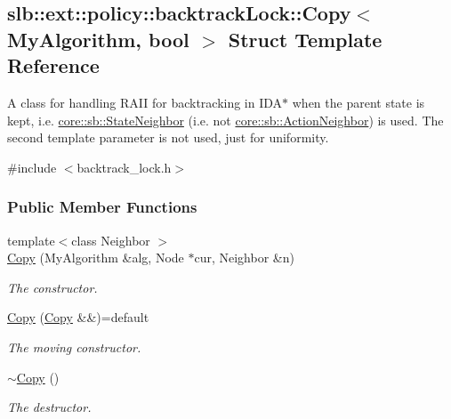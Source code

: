 \hypertarget{structslb_1_1ext_1_1policy_1_1backtrackLock_1_1Copy}{}\subsection{slb\+:\+:ext\+:\+:policy\+:\+:backtrack\+Lock\+:\+:Copy$<$ My\+Algorithm, bool $>$ Struct Template Reference}
\label{structslb_1_1ext_1_1policy_1_1backtrackLock_1_1Copy}


A class for handling R\+A\+II for backtracking in I\+D\+A$\ast$ when the parent state is kept, i.\+e. \hyperlink{structslb_1_1core_1_1sb_1_1StateNeighbor}{core\+::sb\+::\+State\+Neighbor} (i.\+e. not \hyperlink{structslb_1_1core_1_1sb_1_1ActionNeighbor}{core\+::sb\+::\+Action\+Neighbor}) is used. The second template parameter is not used, just for uniformity.  




{\ttfamily \#include $<$backtrack\+\_\+lock.\+h$>$}

\subsubsection*{Public Member Functions}
\begin{DoxyCompactItemize}
\item 
{\footnotesize template$<$class Neighbor $>$ }\\\hyperlink{structslb_1_1ext_1_1policy_1_1backtrackLock_1_1Copy_a419323ae82797feaaca6f7d5a488f7ce}{Copy} (My\+Algorithm \&alg, Node $\ast$cur, Neighbor \&n)
\begin{DoxyCompactList}\small\item\em The constructor. \end{DoxyCompactList}\item 
\hyperlink{structslb_1_1ext_1_1policy_1_1backtrackLock_1_1Copy_ac762b21abbfb3b2d3fd8c74cf5f3f22c}{Copy} (\hyperlink{structslb_1_1ext_1_1policy_1_1backtrackLock_1_1Copy}{Copy} \&\&)=default\hypertarget{structslb_1_1ext_1_1policy_1_1backtrackLock_1_1Copy_ac762b21abbfb3b2d3fd8c74cf5f3f22c}{}\label{structslb_1_1ext_1_1policy_1_1backtrackLock_1_1Copy_ac762b21abbfb3b2d3fd8c74cf5f3f22c}

\begin{DoxyCompactList}\small\item\em The moving constructor. \end{DoxyCompactList}\item 
\hyperlink{structslb_1_1ext_1_1policy_1_1backtrackLock_1_1Copy_a96a2c432f054f03b79bd926257ca5484}{$\sim$\+Copy} ()\hypertarget{structslb_1_1ext_1_1policy_1_1backtrackLock_1_1Copy_a96a2c432f054f03b79bd926257ca5484}{}\label{structslb_1_1ext_1_1policy_1_1backtrackLock_1_1Copy_a96a2c432f054f03b79bd926257ca5484}

\begin{DoxyCompactList}\small\item\em The destructor. \end{DoxyCompactList}\end{DoxyCompactItemize}
